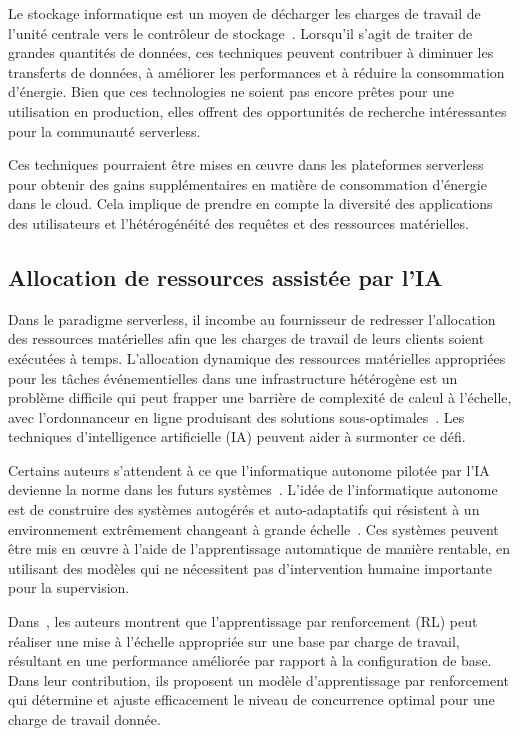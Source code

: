 Le stockage informatique est un moyen de décharger les charges de travail de l'unité centrale vers le contrôleur de stockage~\cite{barbalaceComputationalStorageWhere}. Lorsqu'il s'agit de traiter de grandes quantités de données, ces techniques peuvent contribuer à diminuer les transferts de données, à améliorer les performances et à réduire la consommation d'énergie. Bien que ces technologies ne soient pas encore prêtes pour une utilisation en production, elles offrent des opportunités de recherche intéressantes pour la communauté serverless.

Ces techniques pourraient être mises en œuvre dans les plateformes serverless pour obtenir des gains supplémentaires en matière de consommation d'énergie dans le cloud. Cela implique de prendre en compte la diversité des applications des utilisateurs et l'hétérogénéité des requêtes et des ressources matérielles.

\subsection{Allocation de ressources assistée par l'IA}

Dans le paradigme serverless, il incombe au fournisseur de redresser l'allocation des ressources matérielles afin que les charges de travail de leurs clients soient exécutées à temps. L'allocation dynamique des ressources matérielles appropriées pour les tâches événementielles dans une infrastructure hétérogène est un problème difficile qui peut frapper une barrière de complexité de calcul à l'échelle, avec l'ordonnanceur en ligne produisant des solutions sous-optimales~\cite{lopesTaxonomyJobScheduling2016b}. Les techniques d'intelligence artificielle (IA) peuvent aider à surmonter ce défi.

Certains auteurs s'attendent à ce que l'informatique autonome pilotée par l'IA devienne la norme dans les futurs systèmes~\cite{gillAINextGeneration2022a}. L'idée de l'informatique autonome est de construire des systèmes autogérés et auto-adaptatifs qui résistent à un environnement extrêmement changeant à grande échelle~\cite{puvianiSelfManagementCloudComputing2013}. Ces systèmes peuvent être mis en œuvre à l'aide de l'apprentissage automatique de manière rentable, en utilisant des modèles qui ne nécessitent pas d'intervention humaine importante pour la supervision.

Dans~\cite{schulerAIbasedResourceAllocation2021}, les auteurs montrent que l'apprentissage par renforcement (RL) peut réaliser une mise à l'échelle appropriée sur une base par charge de travail, résultant en une performance améliorée par rapport à la configuration de base. Dans leur contribution, ils proposent un modèle d'apprentissage par renforcement qui détermine et ajuste efficacement le niveau de concurrence optimal pour une charge de travail donnée.

